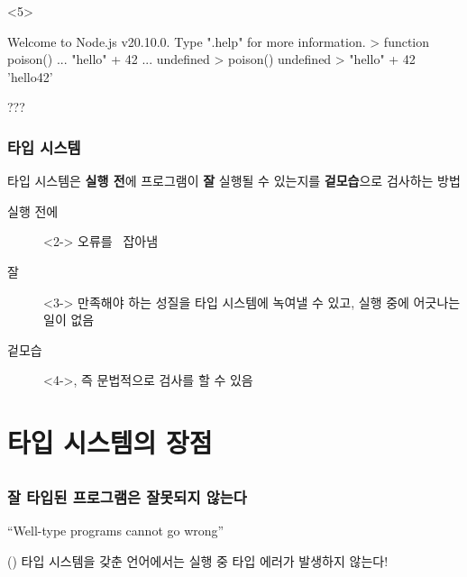 \documentclass{beamer}
\begin{document}
\begin{frame}[c, fragile]
  \begin{onlyenv}<5>
    \begin{jscode}
Welcome to Node.js v20.10.0.
Type ".help" for more information.
> function poison() {
... "hello" + 42
... }
undefined
> poison()
undefined
> "hello" + 42
'hello42'
    \end{jscode}
    ???
  \end{onlyenv}
\end{frame}

\begin{frame}[c, fragile]
  \frametitle{타입 시스템}

  타입 시스템은 \textbf{실행 전}에 프로그램이 \textbf{잘} 실행될 수 있는지를 \textbf{겉모습}으로 검사하는 방법

  \begin{description}
    \item[실행 전에]<2-> 오류를 \ 잡아냄
    \item[잘]<3-> 만족해야 하는 성질을 타입 시스템에 녹여낼 수 있고, 실행 중에 어긋나는 일이 없음
    \item[겉모습]<4->, 즉 문법적으로 검사를 할 수 있음
  \end{description}
\end{frame}


\section{타입 시스템의 장점}
\subsection{}
\begin{frame}[c, fragile]
  \frametitle{잘 타입된 프로그램은 잘못되지 않는다}
  ``Well-type programs cannot go wrong'' 

  () 타입 시스템을 갖춘 언어에서는 실행 중 타입 에러가 발생하지 않는다!
\end{frame}
\end{document}
